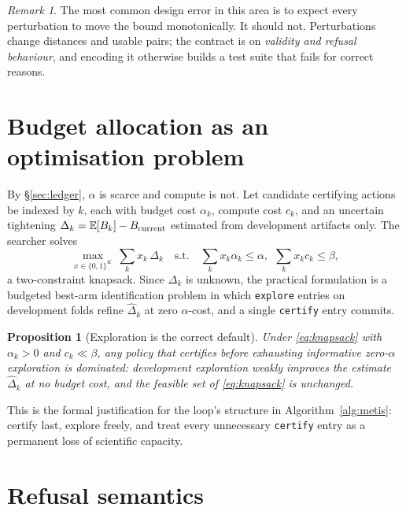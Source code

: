 \documentclass[11pt,a4paper]{article}
\newtheorem{proposition}[theorem]{Proposition}
\theoremstyle{definition}
\theoremstyle{remark}
\newtheorem{remark}[theorem]{Remark}
\newcommand{\E}{\mathbb{E}}
\newcommand{\code}[1]{\texttt{\small#1}}
\begin{document}
\begin{remark}
The most common design error in this area is to expect every perturbation to move the bound monotonically. It should not. Perturbations change distances and usable pairs; the contract is on \emph{validity and refusal behaviour}, and encoding it otherwise builds a test suite that fails for correct reasons.
\end{remark}

\section{Budget allocation as an optimisation problem}\label{sec:alloc}

By \S\ref{sec:ledger}, $\alpha$ is scarce and compute is not. Let candidate certifying actions be indexed by $k$, each with budget cost $\alpha_k$, compute cost $c_k$, and an uncertain tightening $\Delta_k=\E[B_k]-B_{\rm current}$ estimated from development artifacts only. The searcher solves
\begin{equation}
\max_{x\in\{0,1\}^K}\ \sum_k x_k\,\Delta_k
\quad\text{s.t.}\quad \sum_k x_k\alpha_k\le\alpha,\ \ \sum_k x_k c_k\le\beta,
\label{eq:knapsack}
\end{equation}
a two-constraint knapsack. Since $\Delta_k$ is unknown, the practical formulation is a budgeted best-arm identification problem in which \code{explore} entries on development folds refine $\widehat\Delta_k$ at zero $\alpha$-cost, and a single \code{certify} entry commits.

\begin{proposition}[Exploration is the correct default]\label{prop:explorefirst}
Under \eqref{eq:knapsack} with $\alpha_k>0$ and $c_k\ll\beta$, any policy that certifies before exhausting informative zero-$\alpha$ exploration is dominated: development exploration weakly improves the estimate $\widehat\Delta_k$ at no budget cost, and the feasible set of \eqref{eq:knapsack} is unchanged.
\end{proposition}

This is the formal justification for the loop's structure in Algorithm~\ref{alg:metis}: certify last, explore freely, and treat every unnecessary \code{certify} entry as a permanent loss of scientific capacity.

\section{Refusal semantics}\label{sec:refusal}
\end{document}
